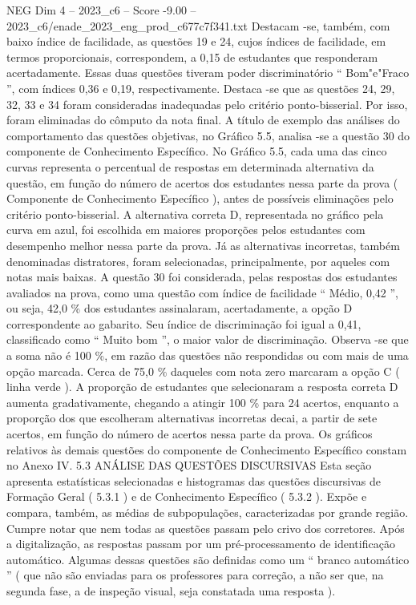 \begin{textsample}{NEG Dim 4 – 2023\_c6 – Score -9.00 – 2023\_c6/enade\_2023\_eng\_prod\_c677c7f341.txt}
Destacam -se, também, com baixo índice de facilidade, as questões 19 e 24, cujos índices de facilidade, em termos proporcionais, correspondem, a 0,15 de estudantes que responderam acertadamente.
Essas duas questões tiveram poder discriminatório “ Bom"e"Fraco ”, com índices 0,36 e 0,19, respectivamente.
Destaca -se que as questões 24, 29, 32, 33 e 34 foram consideradas inadequadas pelo critério ponto-bisserial.
Por isso, foram eliminadas do cômputo da nota final.
A título de exemplo das análises do comportamento das questões objetivas, no Gráfico 5.5, analisa -se a questão 30 do componente de Conhecimento Específico.
No Gráfico 5.5, cada uma das cinco curvas representa o percentual de respostas em determinada alternativa da questão, em função do número de acertos dos estudantes nessa parte da prova ( Componente de Conhecimento Específico ), antes de possíveis eliminações pelo critério ponto-bisserial.
A alternativa correta D, representada no gráfico pela curva em azul, foi escolhida em maiores proporções pelos estudantes com desempenho melhor nessa parte da prova.
Já as alternativas incorretas, também denominadas distratores, foram selecionadas, principalmente, por aqueles com notas mais baixas.
A questão 30 foi considerada, pelas respostas dos estudantes avaliados na prova, como uma questão com índice de facilidade “ Médio, 0,42 ”, ou seja, 42,0 \% dos estudantes assinalaram, acertadamente, a opção D correspondente ao gabarito.
Seu índice de discriminação foi igual a 0,41, classificado como “ Muito bom ”, o maior valor de discriminação.
Observa -se que a soma não é 100 \%, em razão das questões não respondidas ou com mais de uma opção marcada.
Cerca de 75,0 \% daqueles com nota zero marcaram a opção C ( linha verde ).
A proporção de estudantes que selecionaram a resposta correta D aumenta gradativamente, chegando a atingir 100 \% para 24 acertos, enquanto a proporção dos que escolheram alternativas incorretas decai, a partir de sete acertos, em função do número de acertos nessa parte da prova.
Os gráficos relativos às demais questões do componente de Conhecimento Específico constam no Anexo IV. 5.3 ANÁLISE DAS QUESTÕES DISCURSIVAS Esta seção apresenta estatísticas selecionadas e histogramas das questões discursivas de Formação Geral ( 5.3.1 ) e de Conhecimento Específico ( 5.3.2 ).
Expõe e compara, também, as médias de subpopulações, caracterizadas por grande região.
Cumpre notar que nem todas as questões passam pelo crivo dos corretores.
Após a digitalização, as respostas passam por um pré-processamento de identificação automático.
Algumas dessas questões são definidas como um “ branco automático ” ( que não são enviadas para os professores para correção, a não ser que, na segunda fase, a de inspeção visual, seja constatada uma resposta ).

\end{textsample}
